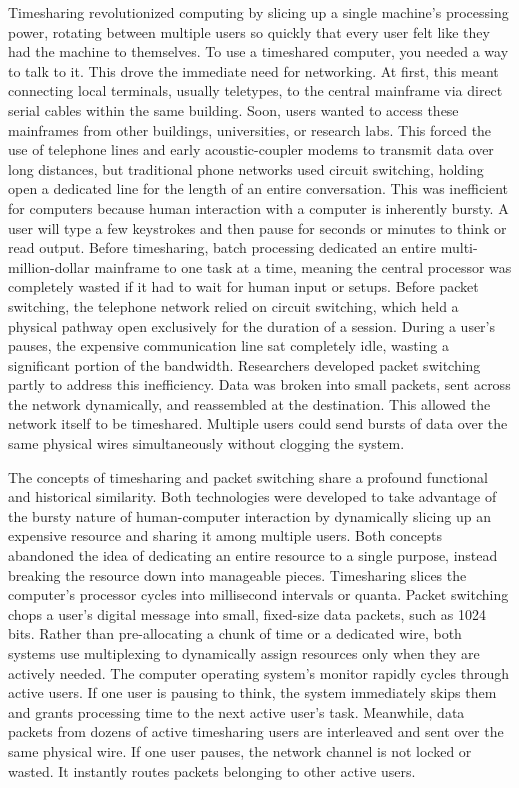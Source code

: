 Timesharing revolutionized computing by slicing up a single machine’s processing power, rotating between multiple users so quickly that every user felt like they had the machine to themselves. To use a timeshared computer, you needed a way to talk to it. This drove the immediate need for networking. At first, this meant connecting local terminals, usually teletypes, to the central mainframe via direct serial cables within the same building. Soon, users wanted to access these mainframes from other buildings, universities, or research labs. This forced the use of telephone lines and early acoustic-coupler modems to transmit data over long distances, but traditional phone networks used circuit switching, holding open a dedicated line for the length of an entire conversation. This was inefficient for computers because human interaction with a computer is inherently bursty. A user will type a few keystrokes and then pause for seconds or minutes to think or read output. Before timesharing, batch processing dedicated an entire multi-million-dollar mainframe to one task at a time, meaning the central processor was completely wasted if it had to wait for human input or setups. Before packet switching, the telephone network relied on circuit switching, which held a physical pathway open exclusively for the duration of a session. During a user's pauses, the expensive communication line sat completely idle, wasting a significant portion of the bandwidth. Researchers developed packet switching partly to address this inefficiency. Data was broken into small packets, sent across the network dynamically, and reassembled at the destination. This allowed the network itself to be timeshared. Multiple users could send bursts of data over the same physical wires simultaneously without clogging the system. 

The concepts of timesharing and packet switching share a profound functional and historical similarity. Both technologies were developed to take advantage of the bursty nature of human-computer interaction by dynamically slicing up an expensive resource and sharing it among multiple users. Both concepts abandoned the idea of dedicating an entire resource to a single purpose, instead breaking the resource down into manageable pieces. Timesharing slices the computer's processor cycles into millisecond intervals or quanta. Packet switching chops a user's digital message into small, fixed-size data packets, such as 1024 bits. Rather than pre-allocating a chunk of time or a dedicated wire, both systems use multiplexing to dynamically assign resources only when they are actively needed. The computer operating system's monitor rapidly cycles through active users. If one user is pausing to think, the system immediately skips them and grants processing time to the next active user's task. Meanwhile, data packets from dozens of active timesharing users are interleaved and sent over the same physical wire. If one user pauses, the network channel is not locked or wasted. It instantly routes packets belonging to other active users.

